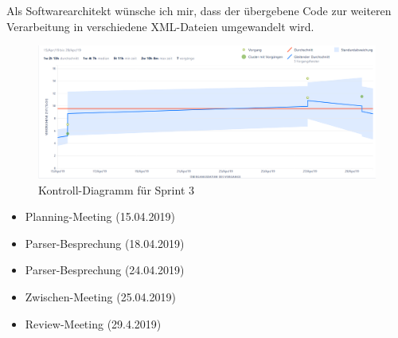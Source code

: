 Als Softwarearchitekt wünsche ich mir, dass der übergebene Code zur weiteren Verarbeitung in verschiedene XML-Dateien umgewandelt wird.
\nsecend
\nsecend%
\nsecend %

\begin{figure}[hbtp]
\centering
\includegraphics[width=\textwidth]{Bilder/KD-Jira.png}
\caption{Kontroll-Diagramm für Sprint 3}
\end{figure}
\nsecend%

\begin{itemize}
\item Planning-Meeting (15.04.2019)
\item Parser-Besprechung (18.04.2019)
\item Parser-Besprechung (24.04.2019)
\item Zwischen-Meeting (25.04.2019)
\item Review-Meeting (29.4.2019)
\end{itemize}
\nsecend%

